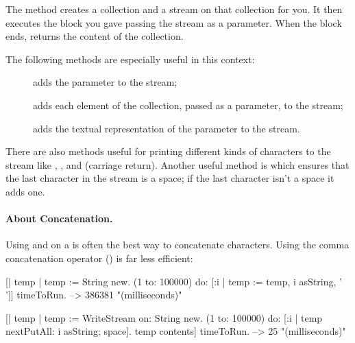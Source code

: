 \documentclass[a4paper,10pt,twoside]{book}
\begin{document}

The method  \label{sec:streamContents} creates a collection and a stream on
that collection for you.
It then executes the block you gave passing the stream as a parameter.
When the block ends,  returns the content of the collection.

The following  methods are especially useful in this context:

\begin{description}
\item[] adds the parameter to the stream;
\item[] adds each element of the collection, passed as a
  parameter, to the stream;
\item[] adds the textual representation of the parameter to the
  stream.
\end{description}

There are also methods useful for printing different kinds of characters to the stream like , , and  (carriage return).
Another useful method is  which ensures that the last character in the stream is a space; if the last character isn't a space it adds one.

\paragraph{About Concatenation.}
Using  and  on a  is often the best way to concatenate characters.
Using the comma concatenation operator (\ct{,}) is far less efficient:

\begin{code}{}
[| temp |
  temp := String new.
  (1 to: 100000) do: [:i |
    temp := temp, i asString, ' ']] timeToRun. --> 386381 "(milliseconds)"

[| temp |
  temp := WriteStream on: String new.
  (1 to: 100000) do: [:i |
    temp nextPutAll: i asString; space].
  temp contents] timeToRun. --> 25 "(milliseconds)"
\end{code}
\end{document}
